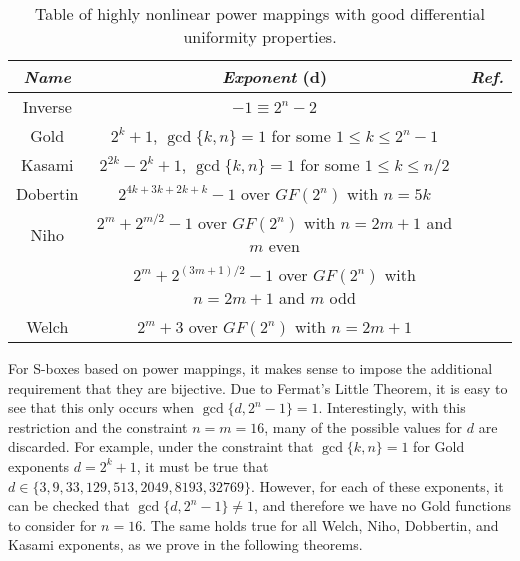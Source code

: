 \begin{table} \label{tab:powerMaps}
\begin{center}
\caption{Table of highly nonlinear power mappings with good differential uniformity properties.}
    \begin{tabular}{c || c | c }
    \hline
    \emph{Name} & \emph{Exponent} (d) & \emph{Ref.} \\ \hline
    Inverse & $-1 \equiv 2^n - 2$ & \cite{Nyberg94-1} \\ \hline
    Gold & $2^{k} + 1$, $\gcd\{k,n\} = 1$ for some $1 \leq k \leq 2^{n} - 1$ & \cite{Courtois05-1} \\ \hline
    Kasami & $2^{2k} - 2^k + 1$, $\gcd\{k,n\} = 1$ for some $1 \leq k \leq n/2$ & \cite{Courtois05-1} \\ \hline
    Dobertin & $2^{4k + 3k + 2k + k} - 1$ over $GF(2^n)$ with $n = 5k$ & \cite{Courtois05-1} \\ \hline
    Niho & $2^{m} + 2^{m/2} - 1$ over $GF(2^n)$ with $n = 2m + 1$ and $m$ even & \cite{Courtois05-1} \\ 
    ~ & $2^{m} + 2^{(3m + 1)/2} - 1$ over $GF(2^n)$ with $n = 2m + 1$ and $m$ odd & ~ \\ \hline
    Welch & $2^m + 3$ over $GF(2^n)$ with $n = 2m + 1$ & \cite{Courtois05-1} \\ \hline
    \end{tabular}
\end{center}
\end{table}
For S-boxes based on power mappings, it makes sense to impose the additional requirement that they are bijective. Due to Fermat's Little Theorem, it is easy to see that this only occurs when $\gcd\{d, 2^n - 1\} = 1$. Interestingly, with this restriction and the constraint $n = m = 16$, many of the possible values for $d$ are discarded. For example, under the constraint that $\gcd\{k,n\} = 1$ for Gold exponents $d = 2^k + 1$, it must be true that $d \in \{3,9,33,129,513,2049,8193,32769\}$. However, for each of these exponents, it can be checked that $\gcd\{d, 2^n - 1\}\not= 1$, and therefore we have no Gold functions to consider for $n = 16$. The same holds true for all Welch, Niho, Dobbertin, and Kasami exponents, as we prove in the following theorems.

